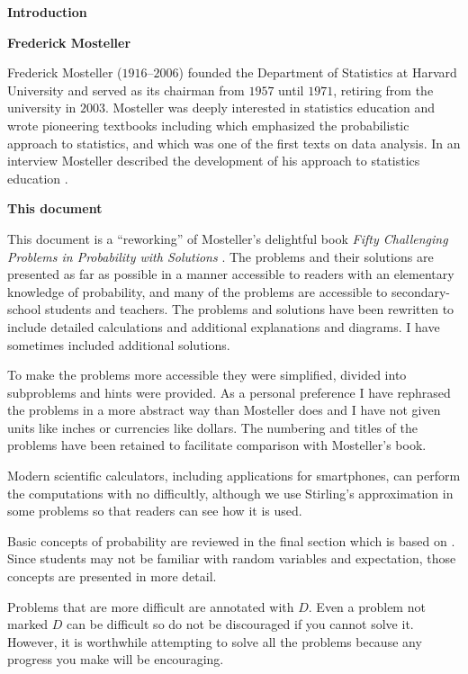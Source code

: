 \begin{NoHyper}
\begin{center}
\textbf{\LARGE Introduction}
\end{center}


\bigskip

\textbf{Frederick Mosteller}

Frederick Mosteller ($1916$--$2006$) founded the Department of Statistics at Harvard University and served as its chairman from $1957$ until $1971$, retiring from the university in $2003$. Mosteller was deeply interested in statistics education and wrote pioneering textbooks including \cite{pwsa} which emphasized the probabilistic approach to statistics, and \cite{bsda} which was one of the first texts on data analysis. In an interview Mosteller described the development of his approach to statistics education \cite{gse}.

\textbf{This document}

This document is a ``reworking'' of Mosteller's delightful book \textit{Fifty Challenging Problems in Probability with Solutions} \cite{fifty}. The problems and their solutions are presented as far as possible in a manner accessible to readers with an elementary knowledge of probability, and many of the problems are accessible to secondary-school students and teachers. The problems and solutions have been rewritten to include detailed calculations and additional explanations and diagrams. I have sometimes included additional solutions.

To make the problems more accessible they were simplified, divided into subproblems and hints were provided. As a personal preference I have rephrased the problems in a more abstract way than Mosteller does and I have not given units like inches or currencies like dollars. The numbering and titles of the problems have been retained to facilitate comparison with Mosteller's book.

Modern scientific calculators, including applications for smartphones, can perform the computations with no difficultly, although we use Stirling's approximation in some problems so that readers can see how it is used.

Basic concepts of probability are reviewed in the final section which is based on \cite{ross}. Since students may not be familiar with random variables and expectation, those concepts are presented in more detail.

Problems that are more difficult are annotated with $D$. Even a problem not marked $D$ can be difficult so do not be discouraged if you cannot solve it. However, it is worthwhile attempting to solve all the problems because any progress you make will be encouraging.

\end{NoHyper}

